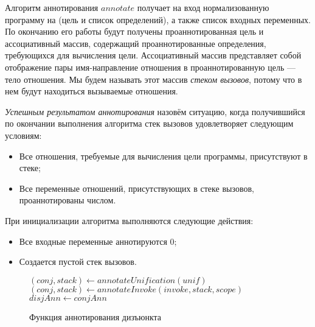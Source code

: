 Алгоритм аннотирования $annotate$ получает на вход нормализованную программу на \miniKanren{} (цель и список определений), а также список входных переменных.
По окончанию его работы будут получены проаннотированная цель и ассоциативный массив, содержащий проаннотированные определения, требующихся для вычисления цели.
Ассоциативный массив представляет собой отображение пары имя-направление отношения в проаннотированную цель --- тело отношения.
Мы будем называть этот массив \emph{стеком вызовов}, потому что в нем будут находиться вызываемые отношения.

\emph{Успешным результатом аннотирования} назовём ситуацию, когда получившийся по окончании выполнения алгоритма стек вызовов удовлетворяет следующим условиям:
\begin{itemize}
    \item Все отношения, требуемые для вычисления цели программы, присутствуют в стеке;
    \item Все переменные отношений, присутствующих в стеке вызовов, проаннотированы числом.
\end{itemize}

При инициализации алгоритма выполняются следующие действия:
\begin{itemize}
    \item Все входные переменные аннотируются $0$;
    \item Создается пустой стек вызовов.
\end{itemize}

\begin{figure}[h!]
  \begin{center}
  \begin{minipage}{\textwidth}
\begin{algorithm}[H]
  \begin{algorithmic}[1]
              \State $(conj, stack) \gets annotateUnification(unif)$
            \EndCase
              \State $(conj,stack) \gets annotateInvoke(invoke,stack,scope)$
            \EndCase
          \EndSwitch
                \State $disjAnn \gets conjAnn$
              \EndIf
            \EndFor
          \EndFor
        \EndFor
    \EndWhile
  \EndFunction
  \end{algorithmic}
\end{algorithm}
  \end{minipage}
  \end{center}
  \caption{Функция аннотирования дизъюнкта}
  \label{alg:annotateDisj}
\end{figure}

